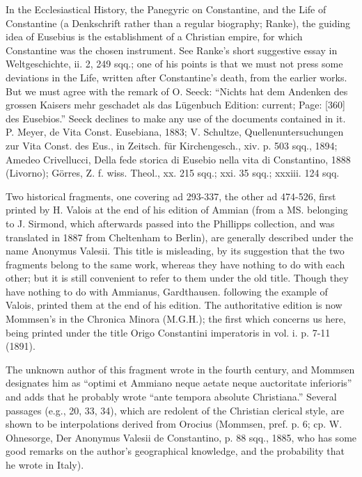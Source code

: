 In the Ecclesiastical History, the Panegyric on Constantine, and the Life of Constantine (a Denkschrift rather than a regular biography; Ranke), the guiding idea of Eusebius is the establishment of a Christian empire, for which Constantine was the chosen instrument. See Ranke\texthebrew{}’s short suggestive essay in Weltgeschichte, ii. 2, 249 sqq.; one of his points is that we must not press some deviations in the Life, written after Constantine\texthebrew{}’s death, from the earlier works. But we must agree with the remark of O. Seeck: \texthebrew{“}Nichts hat dem Andenken des grossen Kaisers mehr geschadet als das Lügenbuch Edition: current; Page: [360] des Eusebios.\texthebrew{}” Seeck declines to make any use of the documents contained in it. P. Meyer, de Vita Const. Eusebiana, 1883; V. Schultze, Quellenuntersuchungen zur Vita Const. des Eus., in Zeitsch. für Kirchengesch., xiv. p. 503 sqq., 1894; Amedeo Crivellucci, Della fede storica di Eusebio nella vita di Constantino, 1888 (Livorno); Görres, Z. f. wiss. Theol., xx. 215 sqq.; xxi. 35 sqq.; xxxiii. 124 sqq.

Two historical fragments, one covering ad 293-337, the other ad 474-526, first printed by H. Valois at the end of his edition of Ammian (from a MS. belonging to J. Sirmond, which afterwards passed into the Phillipps collection, and was translated in 1887 from Cheltenham to Berlin), are generally described under the name Anonymus Valesii. This title is misleading, by its suggestion that the two fragments belong to the same work, whereas they have nothing to do with each other; but it is still convenient to refer to them under the old title. Though they have nothing to do with Ammianus, Gardthausen. following the example of Valois, printed them at the end of his edition. The authoritative edition is now Mommsen\texthebrew{}’s in the Chronica Minora (M.G.H.); the first which concerns us here, being printed under the title Origo Constantini imperatoris in vol. i. p. 7-11 (1891).

The unknown author of this fragment wrote in the fourth century, and Mommsen designates him as \texthebrew{“}optimi et Ammiano neque aetate neque auctoritate inferioris\texthebrew{}” and adds that he probably wrote \texthebrew{“}ante tempora absolute Christiana.\texthebrew{}” Several passages (e.g., 20, 33, 34), which are redolent of the Christian clerical style, are shown to be interpolations derived from Orocius (Mommsen, pref. p. 6; cp. W. Ohnesorge, Der Anonymus Valesii de Constantino, p. 88 sqq., 1885, who has some good remarks on the author\texthebrew{}’s geographical knowledge, and the probability that he wrote in Italy).

